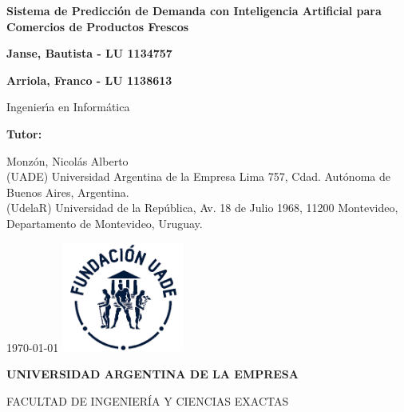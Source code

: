 \begin{titlepage} %

    \centering
    {\textbf{\fontsize{16}{17}\selectfont  Sistema de Predicción de Demanda con Inteligencia Artificial para Comercios de Productos Frescos} \par}
    \vspace{1cm}
    {\textbf{\fontsize{16}{17}\selectfont Janse, Bautista - LU 1134757} \par}
    {\textbf{\fontsize{16}{17}\selectfont Arriola, Franco - LU 1138613} \par}
    \vspace{1.5cm}
    {\fontsize{16}{17}\selectfont Ingenier\'{\i}a en Inform\'atica \par}
    \vspace{1cm}
    {\textbf{\fontsize{14}{14}\selectfont Tutor:} \par}
    {\fontsize{14}{14}\selectfont Monzón, Nicolás Alberto
        \\ (UADE) Universidad Argentina de la Empresa Lima 757, Cdad. Autónoma de Buenos Aires, Argentina.
        \\ (UdelaR) Universidad de la República, Av. 18 de Julio 1968, 11200 Montevideo, Departamento de Montevideo, Uruguay.
        \par}
    \vspace{1cm}
    \vfill
    \today
    \vfill
    \includegraphics[width=0.30\textwidth]{./images/UADE}\par \vspace{1cm}
    {\textbf{\fontsize{14}{14}\selectfont UNIVERSIDAD ARGENTINA DE LA EMPRESA} \par}
    {\fontsize{14}{14}\selectfont FACULTAD DE INGENIER\'IA Y CIENCIAS EXACTAS \par}

\end{titlepage}

